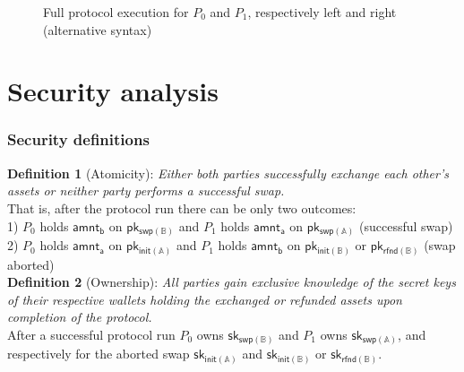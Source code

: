 \documentclass{article}      	%
\newcommand{\commentline}[2]{%
    \tikz[remember picture, overlay]{
        \node [black,anchor=west,xshift=10pt] at (#1) {#2};
    }
}
\newcommand{\blockcomment}[3]{%
    \tikz[remember picture, overlay]{
        \draw [decorate,decoration={lineto,amplitude=10pt,mirror,raise=4pt},yshift=0pt,very thick,{#3}] 
        (#1) -- (#2) node [black,midway,xshift=10pt] {};
    }
}
\begin{document}
\begin{figure}[H]
\begin{minipage}[t]{0.5\textwidth}
\begin{pchstack}[boxed]


\end{pchstack}
\end{minipage}%
\caption{Full protocol execution for $P_0$ and $P_1$, respectively left and right (alternative syntax)}
\end{figure}

\newpage

\section{Security analysis}

\subsubsection*{Security definitions}

\textbf{Definition 1} (Atomicity): \textit{Either both parties successfully exchange each other's assets or neither party performs a successful swap.}
\vspace{0.5em}
\\
That is, after the protocol run there can be only two outcomes: \\
1) $P_0$ holds $\mathsf{amnt_b}$ on $\mathsf{pk_{swp(\mathbb{B})}}$ and $P_1$ holds $\mathsf{amnt_a}$ on $\mathsf{pk_{swp(\mathbb{A})}}$ (successful swap) \\
2) $P_0$ holds $\mathsf{amnt_a}$ on $\mathsf{pk_{init(\mathbb{A})}}$ and $P_1$ holds $\mathsf{amnt_b}$ on $\mathsf{pk_{init(\mathbb{B})}}$ or $\mathsf{pk_{rfnd(\mathbb{B})}}$ (swap aborted) \\

\textbf{Definition 2} (Ownership): \textit{All parties gain exclusive knowledge of the secret keys of their respective wallets holding the exchanged or refunded assets upon completion of the protocol.} 
\vspace{0.5em}
\\
After a successful protocol run $P_0$ owns $\mathsf{sk_{swp(\mathbb{B})}}$ and $P_1$ owns $\mathsf{sk_{swp(\mathbb{A})}}$, and respectively for the aborted swap  $\mathsf{sk_{init(\mathbb{A})}}$ and $\mathsf{sk_{init(\mathbb{B})}}$ or $\mathsf{sk_{rfnd(\mathbb{B})}}$. \\
\end{document}
